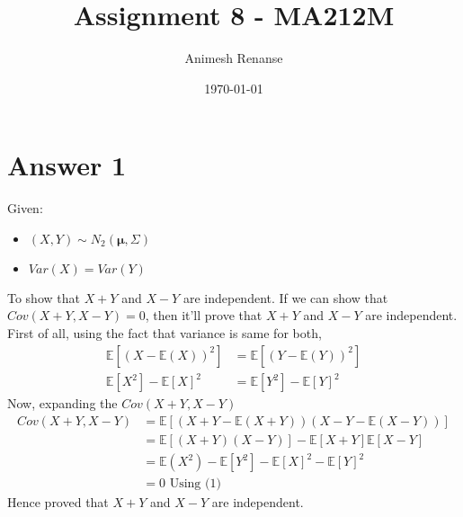 \documentclass[a4paper]{article}
\title{Assignment 8 - MA212M}
\author{Animesh Renanse}
\date{\today}
\begin{document}
\maketitle
\newpage
\section{Answer 1}
Given:
\begin{itemize}
	\item {$\left( X,Y \right) \sim N_2\left( \mathbf{\mu},\Sigma \right) $}
	\item{$Var\left( X \right) = Var\left( Y \right)  $}
\end{itemize}
To show that $X+ Y$ and $X-Y$ are independent.
 \newline\newline
 If we can show that $Cov\left( X+Y,X-Y \right) =0$, then it'll prove that $X+Y$ and  $X-Y$ are independent.
 \newline\newline
 First of all, using the fact that variance is same for both,
 \begin{equation}
 	\begin{split}
 		\mathbb{E}\left[ \left( X - \mathbb{E}\left( X \right)  \right) ^{2} \right] &=  \mathbb{E}\left[ \left( Y - \mathbb{E}\left( Y \right)  \right) ^{2} \right]\\
		\mathbb{E}\left[ X^2 \right] - \mathbb{E}\left[ X \right]^2 &=  \mathbb{E}\left[ Y^2 \right] - \mathbb{E}\left[ Y \right] ^2 
	\end{split}
 \end{equation}
 Now, expanding the $Cov\left( X+Y, X-Y \right) $
 \begin{equation*}
 	\begin{split}
		Cov\left( X+Y, X-Y \right) &= \mathbb{E}\left[ \left( X+Y-\mathbb{E}\left( X+Y \right)  \right) \left( X-Y- \mathbb{E}\left( X-Y \right) \right)  \right]\\
		&= \mathbb{E}\left[ \left( X+Y \right) \left( X-Y \right)  \right] - \mathbb{E}\left[ X+Y \right] \mathbb{E}\left[ X-Y \right]\\
	&= 	\mathbb{E}\left( X^2 \right) - \mathbb{E}\left[ Y^2 \right] - \mathbb{E}\left[ X \right] ^2 - \mathbb{E}\left[ Y \right] ^2\\
	&= 0 \text{ Using (1)}
 	\end{split}
 \end{equation*}
 Hence proved that $X+Y $ and  $ X-Y$ are independent.
\end{document}
